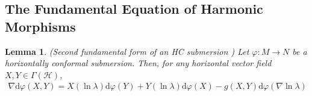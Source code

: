 \documentclass[12pt]{article}
\newcommand{\Dd}{\nabla \text{d}}
\newcommand{\diff}{\text{d}}
\newtheorem{lemma}[theorem]{Lemma}
\theoremstyle{definition}
\numberwithin{equation}{subsection}
\begin{document}

\subsection{The Fundamental Equation of Harmonic Morphisms}
\begin{lemma} 
(Second fundamental form of an HC submersion \cite{BairdWood}) Let $\varphi : M \rightarrow N$ be a horizontally conformal submersion. Then, for any horizontal vector field $X, Y \in \Gamma(\mathcal{H})$,
\begin{align}\label{eq: SecFund}
\Dd \varphi(X, Y) = X(\ln{\lambda}) \diff \varphi(Y) + Y(\ln \lambda) \diff \varphi(X) - g(X,Y) \diff\varphi(\nabla \ln{\lambda})
\end{align}
\end{lemma}
\end{document}
